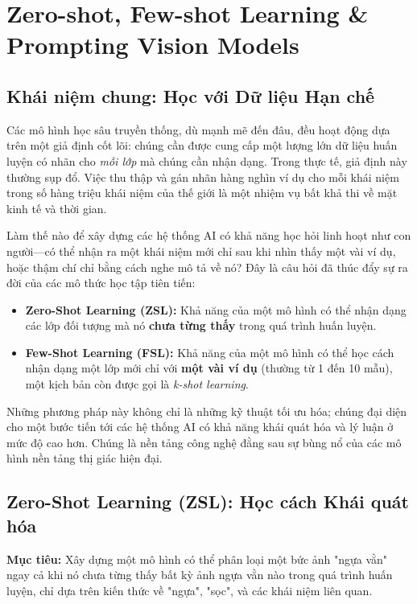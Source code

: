 \section{Zero-shot, Few-shot Learning \& Prompting Vision Models}
\label{sec:zero_few_shot_prompting}

\subsection{Khái niệm chung: Học với Dữ liệu Hạn chế}
\label{subsec:zsl_fsl_overview}
Các mô hình học sâu truyền thống, dù mạnh mẽ đến đâu, đều hoạt động dựa trên một giả định cốt lõi: chúng cần được cung cấp một lượng lớn dữ liệu huấn luyện có nhãn cho \textit{mỗi lớp} mà chúng cần nhận dạng. Trong thực tế, giả định này thường sụp đổ. Việc thu thập và gán nhãn hàng nghìn ví dụ cho mỗi khái niệm trong số hàng triệu khái niệm của thế giới là một nhiệm vụ bất khả thi về mặt kinh tế và thời gian.

Làm thế nào để xây dựng các hệ thống AI có khả năng học hỏi linh hoạt như con người—có thể nhận ra một khái niệm mới chỉ sau khi nhìn thấy một vài ví dụ, hoặc thậm chí chỉ bằng cách nghe mô tả về nó? Đây là câu hỏi đã thúc đẩy sự ra đời của các mô thức học tập tiên tiến:
\begin{itemize}
	\item \textbf{Zero-Shot Learning (ZSL):} Khả năng của một mô hình có thể nhận dạng các lớp đối tượng mà nó \textbf{chưa từng thấy} trong quá trình huấn luyện.
	\item \textbf{Few-Shot Learning (FSL):} Khả năng của một mô hình có thể học cách nhận dạng một lớp mới chỉ với \textbf{một vài ví dụ} (thường từ 1 đến 10 mẫu), một kịch bản còn được gọi là \textit{k-shot learning}.
\end{itemize}
Những phương pháp này không chỉ là những kỹ thuật tối ưu hóa; chúng đại diện cho một bước tiến tới các hệ thống AI có khả năng khái quát hóa và lý luận ở mức độ cao hơn. Chúng là nền tảng công nghệ đằng sau sự bùng nổ của các mô hình nền tảng thị giác hiện đại.

\subsection{Zero-Shot Learning (ZSL): Học cách Khái quát hóa}
\label{subsec:zero_shot_learning}
\textbf{Mục tiêu:} Xây dựng một mô hình có thể phân loại một bức ảnh "ngựa vằn" ngay cả khi nó chưa từng thấy bất kỳ ảnh ngựa vằn nào trong quá trình huấn luyện, chỉ dựa trên kiến thức về "ngựa", "sọc", và các khái niệm liên quan.

